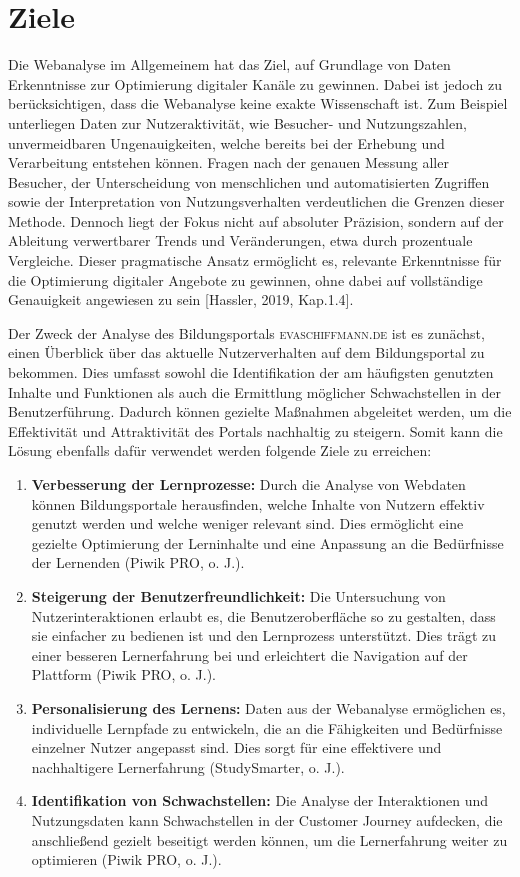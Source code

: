 \section{Ziele} %
Die Webanalyse im Allgemeinem hat das Ziel, auf Grundlage von Daten Erkenntnisse zur Optimierung digitaler Kanäle zu gewinnen. Dabei ist jedoch zu berücksichtigen, dass die Webanalyse keine exakte Wissenschaft ist. Zum Beispiel unterliegen Daten zur Nutzeraktivität, wie Besucher- und Nutzungszahlen, unvermeidbaren Ungenauigkeiten, welche bereits bei der Erhebung und Verarbeitung entstehen können. Fragen nach der genauen Messung aller Besucher, der Unterscheidung von menschlichen und automatisierten Zugriffen sowie der Interpretation von Nutzungsverhalten verdeutlichen die Grenzen dieser Methode. Dennoch liegt der Fokus nicht auf absoluter Präzision, sondern auf der Ableitung verwertbarer Trends und Veränderungen, etwa durch prozentuale Vergleiche. Dieser pragmatische Ansatz ermöglicht es, relevante Erkenntnisse für die Optimierung digitaler Angebote zu gewinnen, ohne dabei auf vollständige Genauigkeit angewiesen zu sein [Hassler, 2019, Kap.1.4].

Der Zweck der Analyse des Bildungsportals \textsc{evaschiffmann.de} ist es zunächst, einen Überblick über das aktuelle Nutzerverhalten auf dem Bildungsportal zu bekommen. Dies umfasst sowohl die Identifikation der am häufigsten genutzten Inhalte und Funktionen als auch die Ermittlung möglicher Schwachstellen in der Benutzerführung. Dadurch können gezielte Maßnahmen abgeleitet werden, um die Effektivität und Attraktivität des Portals nachhaltig zu steigern. Somit kann die Lösung ebenfalls dafür verwendet werden folgende Ziele zu erreichen: 
\begin{enumerate}
    \item \textbf{Verbesserung der Lernprozesse:}
    Durch die Analyse von Webdaten können Bildungsportale herausfinden, welche Inhalte von Nutzern effektiv genutzt werden und welche weniger relevant sind. Dies ermöglicht eine gezielte Optimierung der Lerninhalte und eine Anpassung an die Bedürfnisse der Lernenden (Piwik PRO, o. J.).
    \item \textbf{Steigerung der Benutzerfreundlichkeit:}
    Die Untersuchung von Nutzerinteraktionen erlaubt es, die Benutzeroberfläche so zu gestalten, dass sie einfacher zu bedienen ist und den Lernprozess unterstützt. Dies trägt zu einer besseren Lernerfahrung bei und erleichtert die Navigation auf der Plattform (Piwik PRO, o. J.).
    \item \textbf{Personalisierung des Lernens:}
    Daten aus der Webanalyse ermöglichen es, individuelle Lernpfade zu entwickeln, die an die Fähigkeiten und Bedürfnisse einzelner Nutzer angepasst sind. Dies sorgt für eine effektivere und nachhaltigere Lernerfahrung (StudySmarter, o. J.).
    \item \textbf{Identifikation von Schwachstellen:} Die Analyse der Interaktionen und Nutzungsdaten kann Schwachstellen in der Customer Journey aufdecken, die anschließend gezielt beseitigt werden können, um die Lernerfahrung weiter zu optimieren (Piwik PRO, o. J.).
\end{enumerate} 

